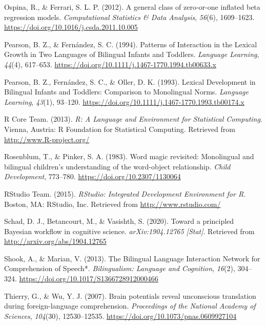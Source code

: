\documentclass[english,man,man,floatsintext]{apa6}
\begin{document}
\leavevmode\hypertarget{ref-ospina2012}{}%
Ospina, R., \& Ferrari, S. L. P. (2012). A general class of zero-or-one inflated beta regression models. \emph{Computational Statistics \& Data Analysis}, \emph{56}(6), 1609--1623. \url{https://doi.org/10.1016/j.csda.2011.10.005}

\leavevmode\hypertarget{ref-pearson1994}{}%
Pearson, B. Z., \& Fernández, S. C. (1994). Patterns of Interaction in the Lexical Growth in Two Languages of Bilingual Infants and Toddlers. \emph{Language Learning}, \emph{44}(4), 617--653. \url{https://doi.org/10.1111/j.1467-1770.1994.tb00633.x}

\leavevmode\hypertarget{ref-pearson1993}{}%
Pearson, B. Z., Fernández, S. C., \& Oller, D. K. (1993). Lexical Development in Bilingual Infants and Toddlers: Comparison to Monolingual Norms. \emph{Language Learning}, \emph{43}(1), 93--120. \url{https://doi.org/10.1111/j.1467-1770.1993.tb00174.x}

\leavevmode\hypertarget{ref-rcoreteam2013}{}%
R Core Team. (2013). \emph{R: A Language and Environment for Statistical Computing}. Vienna, Austria: R Foundation for Statistical Computing. Retrieved from \url{http://www.R-project.org/}

\leavevmode\hypertarget{ref-rosenblum1983word}{}%
Rosenblum, T., \& Pinker, S. A. (1983). Word magic revisited: Monolingual and bilingual children's understanding of the word-object relationship. \emph{Child Development}, 773--780. \url{https://doi.org/10.2307/1130064}

\leavevmode\hypertarget{ref-rstudioteam2015}{}%
RStudio Team. (2015). \emph{RStudio: Integrated Development Environment for R}. Boston, MA: RStudio, Inc. Retrieved from \url{http://www.rstudio.com/}

\leavevmode\hypertarget{ref-schad2020}{}%
Schad, D. J., Betancourt, M., \& Vasishth, S. (2020). Toward a principled Bayesian workflow in cognitive science. \emph{arXiv:1904.12765 {[}Stat{]}}. Retrieved from \url{http://arxiv.org/abs/1904.12765}

\leavevmode\hypertarget{ref-shook2013}{}%
Shook, A., \& Marian, V. (2013). The Bilingual Language Interaction Network for Comprehension of Speech*. \emph{Bilingualism: Language and Cognition}, \emph{16}(2), 304--324. \url{https://doi.org/10.1017/S1366728912000466}

\leavevmode\hypertarget{ref-thierry2007}{}%
Thierry, G., \& Wu, Y. J. (2007). Brain potentials reveal unconscious translation during foreign-language comprehension. \emph{Proceedings of the National Academy of Sciences}, \emph{104}(30), 12530--12535. \url{https://doi.org/10.1073/pnas.0609927104}
\end{document}
